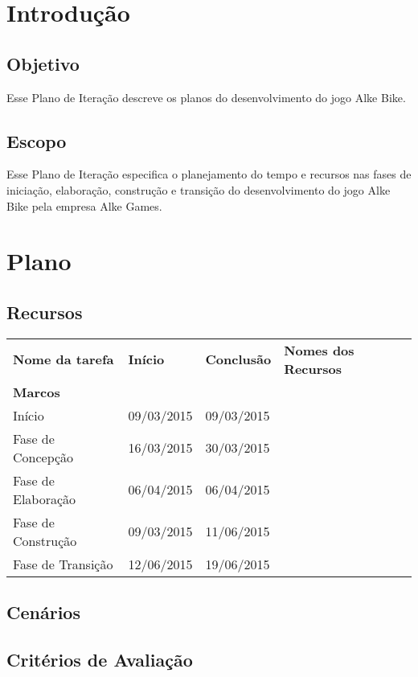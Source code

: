 \section{Introdução} 
\subsection{Objetivo}

Esse Plano de Iteração descreve os planos do desenvolvimento do jogo Alke Bike.

\subsection{Escopo}

Esse Plano de Iteração especifica o planejamento do tempo e recursos nas fases de iniciação, elaboração, construção e transição do desenvolvimento do jogo Alke Bike pela empresa Alke Games.

\section{Plano}

\subsection{Recursos}

\begin{table}[h]
\begin{tabular}{llll}
\textbf{Nome da tarefa} & \textbf{Início} & \textbf{Conclusão} & \textbf{Nomes dos Recursos} \\
\textbf{Marcos}         &                 &                    &                             \\
Início                  & 09/03/2015      & 09/03/2015         &                             \\
Fase de Concepção       & 16/03/2015      & 30/03/2015         &                             \\
Fase de Elaboração      & 06/04/2015      & 06/04/2015         &                             \\
Fase de Construção      & 09/03/2015      & 11/06/2015         &                             \\
Fase de Transição       & 12/06/2015      & 19/06/2015         &                            
\end{tabular}
\end{table}

\subsection{Cenários}

\subsection{Critérios de Avaliação}
